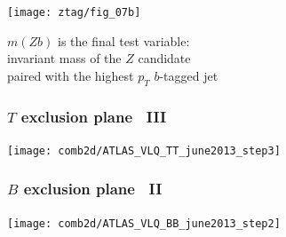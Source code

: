 \documentclass[xcolor=dvipsnames,10pt]{beamer}
\begin{document}
\begin{frame}
\begin{minipage}{.6\textwidth}
\begin{minipage}{.55\textwidth}
\end{minipage}


\end{minipage}\begin{minipage}{.4\textwidth}
\centering


\texttt{[image: ztag/fig\_07b]}
\scriptsize

$m(Zb)$ is the final test variable:\\
invariant mass of the $Z$ candidate\\
paired with the highest $p_T$ $b$-tagged jet

\end{minipage}

\end{frame}


\begin{frame}\frametitle{$T$ exclusion plane~\cite{combination} III}
\footnotesize\centering

\texttt{[image: comb2d/ATLAS\_VLQ\_TT\_june2013\_step3]}

\end{frame}


\begin{frame}\frametitle{$B$ exclusion plane~\cite{combination} II}
\footnotesize\centering

\texttt{[image: comb2d/ATLAS\_VLQ\_BB\_june2013\_step2]}

\end{frame}



\end{document}
